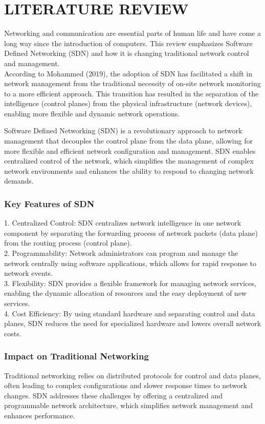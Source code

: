 \chapter*{\centering LITERATURE REVIEW}
Networking and communication are essential parts of human life and have come a long way since the introduction of computers. This review emphasizes Software Defined Networking (SDN) and how it is changing traditional network control and management.\\

According to Mohammed (2019), the adoption of SDN has facilitated a shift in network management from the traditional necessity of on-site network monitoring to a more efficient approach. This transition has resulted in the separation of the intelligence (control planes) from the physical infrastructure (network devices), enabling more flexible and dynamic network operations.

	Software Defined Networking (SDN) is a revolutionary approach to network management that decouples the control plane from the data plane, allowing for more flexible and efficient network configuration and management. SDN enables centralized control of the network, which simplifies the management of complex network environments and enhances the ability to respond to changing network demands.

	\subsection*{Key Features of SDN}

	1. Centralized Control: SDN centralizes network intelligence in one network component by separating the forwarding process of network packets (data plane) from the routing process (control plane).\\
	2. Programmability: Network administrators can program and manage the network centrally using software applications, which allows for rapid response to network events.\\
	3. Flexibility: SDN provides a flexible framework for managing network services, enabling the dynamic allocation of resources and the easy deployment of new services.\\
	4. Cost Efficiency: By using standard hardware and separating control and data planes, SDN reduces the need for specialized hardware and lowers overall network costs.

	\subsection*{Impact on Traditional Networking}

	Traditional networking relies on distributed protocols for control and data planes, often leading to complex configurations and slower response times to network changes. SDN addresses these challenges by offering a centralized and programmable network architecture, which simplifies network management and enhances performance.
